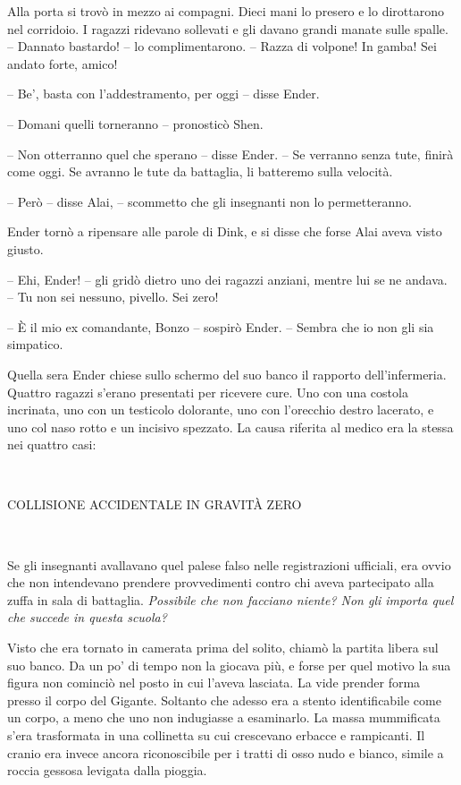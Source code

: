 {Alla porta si trovò in mezzo ai compagni. Dieci mani lo presero e lo
	dirottarono nel corridoio. I ragazzi ridevano sollevati e gli davano
	grandi manate sulle spalle. -- Dannato bastardo! -- lo complimentarono.
	-- Razza di volpone! In gamba! Sei andato forte, amico!}

{-- Be', basta con l'addestramento, per oggi -- disse Ender.}

{-- Domani quelli torneranno -- pronosticò Shen.}

{-- Non otterranno quel che sperano -- disse Ender. -- Se verranno senza
	tute, finirà come oggi. Se avranno le tute da battaglia, li batteremo
	sulla velocità.}

{-- Però -- disse Alai, -- scommetto che gli insegnanti non lo
	permetteranno.}

{Ender tornò a ripensare alle parole di Dink, e si disse che forse Alai
	aveva visto giusto.}

{-- Ehi, Ender! -- gli gridò dietro uno dei ragazzi anziani, mentre lui
	se ne andava. -- Tu non sei nessuno, pivello. Sei zero!}

{-- È il mio ex comandante, Bonzo -- sospirò Ender. -- Sembra che io non
	gli sia simpatico.}

{Quella sera Ender chiese sullo schermo del suo banco il rapporto
	dell'infermeria. Quattro ragazzi s'erano presentati per ricevere cure.
	Uno con una costola incrinata, uno con un testicolo dolorante, uno con
	l'orecchio destro lacerato, e uno col naso rotto e un incisivo spezzato.
	La causa riferita al medico era la stessa nei quattro casi:}

{~}

\begin{center}
	{COLLISIONE ACCIDENTALE IN GRAVITÀ ZERO}
\end{center}

{~}

{Se gli insegnanti avallavano quel palese falso nelle registrazioni
	ufficiali, era ovvio che non intendevano prendere provvedimenti contro
	chi aveva partecipato alla zuffa in sala di battaglia. \emph{Possibile
		che non facciano niente? Non gli importa quel che succede in questa
		scuola?}}

{Visto che era tornato in camerata prima del solito, chiamò la partita
	libera sul suo banco. Da un po' di tempo non la giocava più, e forse per
	quel motivo la sua figura non cominciò nel posto in cui l'aveva
	lasciata. La vide prender forma presso il corpo del Gigante. Soltanto
	che adesso era a stento identificabile come un corpo, a meno che uno non
	indugiasse a esaminarlo. La massa mummificata s'era trasformata in una
	collinetta su cui crescevano erbacce e rampicanti. Il cranio era invece
	ancora riconoscibile per i tratti di osso nudo e bianco, simile a roccia
	gessosa levigata dalla pioggia.}

